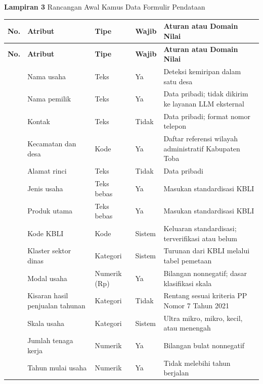 \documentclass[12pt,a4paper]{report}
\begin{document}
\newpage
\noindent\textbf{Lampiran 3} Rancangan Awal Kamus Data Formulir Pendataan%
{}

\vspace{1em}
{\footnotesize
\setlength{\tabcolsep}{4pt}
\renewcommand{\arraystretch}{1.15}
\begin{longtable}{|>{\centering\arraybackslash}p{}|L{0.20\textwidth}|L{0.15\textwidth}|L{0.10\textwidth}|L{0.38\textwidth}|}
\hline
\textbf{No.} & \textbf{Atribut} & \textbf{Tipe} & \textbf{Wajib} & \textbf{Aturan atau Domain Nilai} \\ \hline
\endfirsthead
\hline
\textbf{No.} & \textbf{Atribut} & \textbf{Tipe} & \textbf{Wajib} & \textbf{Aturan atau Domain Nilai} \\ \hline
{} & Nama usaha & Teks & Ya & Deteksi kemiripan dalam satu desa \\  & Nama pemilik & Teks & Ya & Data pribadi; tidak dikirim ke layanan LLM eksternal \\  & Kontak & Teks & Tidak & Data pribadi; format nomor telepon \\  & Kecamatan dan desa & Kode & Ya & Daftar referensi wilayah administratif Kabupaten Toba \\  & Alamat rinci & Teks & Tidak & Data pribadi \\  & Jenis usaha & Teks bebas & Ya & Masukan standardisasi KBLI \\  & Produk utama & Teks bebas & Ya & Masukan standardisasi KBLI \\  & Kode KBLI & Kode & Sistem & Keluaran standardisasi; terverifikasi atau belum \\  & Klaster sektor dinas & Kategori & Sistem & Turunan dari KBLI melalui tabel pemetaan \\  & Modal usaha & Numerik (Rp) & Ya & Bilangan nonnegatif; dasar klasifikasi skala \\  & Kisaran hasil penjualan tahunan & Kategori & Tidak & Rentang sesuai kriteria PP Nomor 7 Tahun 2021 \\  & Skala usaha & Kategori & Sistem & Ultra mikro, mikro, kecil, atau menengah \\  & Jumlah tenaga kerja & Numerik & Ya & Bilangan bulat nonnegatif \\  & Tahun mulai usaha & Numerik & Ya & Tidak melebihi tahun berjalan \\ \hline

\end{longtable}}
\end{document}
